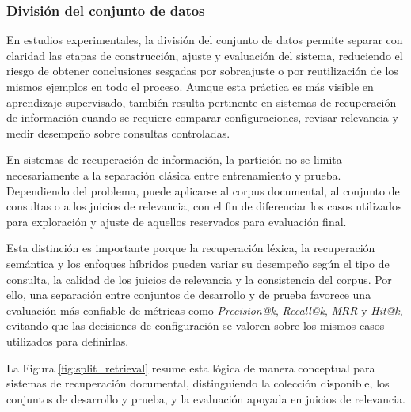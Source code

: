 \subsubsection*{División del conjunto de datos}

En estudios experimentales, la división del conjunto de datos permite separar con claridad las etapas de construcción, ajuste y evaluación del sistema, reduciendo el riesgo de obtener conclusiones sesgadas por sobreajuste o por reutilización de los mismos ejemplos en todo el proceso. Aunque esta práctica es más visible en aprendizaje supervisado, también resulta pertinente en sistemas de recuperación de información cuando se requiere comparar configuraciones, revisar relevancia y medir desempeño sobre consultas controladas.

En sistemas de recuperación de información, la partición no se limita necesariamente a la separación clásica entre entrenamiento y prueba. Dependiendo del problema, puede aplicarse al corpus documental, al conjunto de consultas o a los juicios de relevancia, con el fin de diferenciar los casos utilizados para exploración y ajuste de aquellos reservados para evaluación final.

Esta distinción es importante porque la recuperación léxica, la recuperación semántica y los enfoques híbridos pueden variar su desempeño según el tipo de consulta, la calidad de los juicios de relevancia y la consistencia del corpus. Por ello, una separación entre conjuntos de desarrollo y de prueba favorece una evaluación más confiable de métricas como \textit{Precision@k}, \textit{Recall@k}, \textit{MRR} y \textit{Hit@k}, evitando que las decisiones de configuración se valoren sobre los mismos casos utilizados para definirlas.

La Figura \ref{fig:split_retrieval} resume esta lógica de manera conceptual para sistemas de recuperación documental, distinguiendo la colección disponible, los conjuntos de desarrollo y prueba, y la evaluación apoyada en juicios de relevancia.

